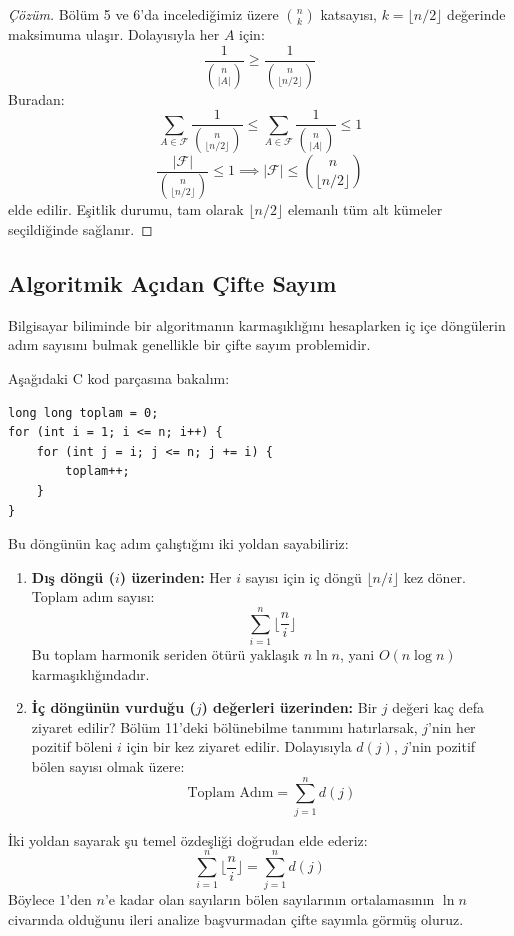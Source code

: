 \begin{proof}[Çözüm]
Bölüm 5 ve 6'da incelediğimiz üzere $\binom{n}{k}$ katsayısı, $k = \lfloor n/2 \rfloor$ değerinde maksimuma ulaşır. Dolayısıyla her $A$ için:
\[ \frac{1}{\binom{n}{|A|}} \ge \frac{1}{\binom{n}{\lfloor n/2 \rfloor}} \]
Buradan:
\[ \sum_{A \in \mathcal{F}} \frac{1}{\binom{n}{\lfloor n/2 \rfloor}} \le \sum_{A \in \mathcal{F}} \frac{1}{\binom{n}{|A|}} \le 1 \]
\[ \frac{|\mathcal{F}|}{\binom{n}{\lfloor n/2 \rfloor}} \le 1 \implies |\mathcal{F}| \le \binom{n}{\lfloor n/2 \rfloor} \]
elde edilir. Eşitlik durumu, tam olarak $\lfloor n/2 \rfloor$ elemanlı tüm alt kümeler seçildiğinde sağlanır.
\end{proof}

\subsection{Algoritmik Açıdan Çifte Sayım}

Bilgisayar biliminde bir algoritmanın karmaşıklığını hesaplarken iç içe döngülerin adım sayısını bulmak genellikle bir çifte sayım problemidir.

Aşağıdaki C kod parçasına bakalım:
\begin{lstlisting}[language=CTemel]
long long toplam = 0;
for (int i = 1; i <= n; i++) {
    for (int j = i; j <= n; j += i) {
        toplam++;
    }
}
\end{lstlisting}

Bu döngünün kaç adım çalıştığını iki yoldan sayabiliriz:
\begin{enumerate}
    \item \textbf{Dış döngü ($i$) üzerinden:} Her $i$ sayısı için iç döngü $\lfloor n/i \rfloor$ kez döner. Toplam adım sayısı:
    \[ \sum_{i=1}^{n} \lfloor \frac{n}{i} \rfloor \]
    Bu toplam harmonik seriden ötürü yaklaşık $n \ln n$, yani $O(n \log n)$ karmaşıklığındadır.
    \item \textbf{İç döngünün vurduğu ($j$) değerleri üzerinden:} Bir $j$ değeri kaç defa ziyaret edilir? Bölüm 11'deki bölünebilme tanımını hatırlarsak, $j$'nin her pozitif böleni $i$ için bir kez ziyaret edilir. Dolayısıyla $d(j)$, $j$'nin pozitif bölen sayısı olmak üzere:
    \[ \text{Toplam Adım} = \sum_{j=1}^{n} d(j) \]
\end{enumerate}
İki yoldan sayarak şu temel özdeşliği doğrudan elde ederiz:
\[ \sum_{i=1}^{n} \lfloor \frac{n}{i} \rfloor = \sum_{j=1}^{n} d(j) \]
Böylece $1$'den $n$'e kadar olan sayıların bölen sayılarının ortalamasının $\ln n$ civarında olduğunu ileri analize başvurmadan çifte sayımla görmüş oluruz.

